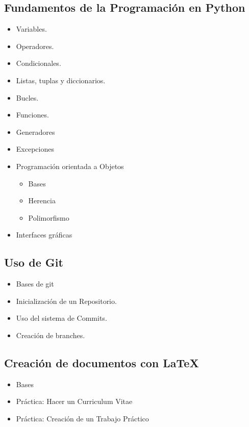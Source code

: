 \documentclass{article}
\begin{document}
\subsection{Fundamentos de la Programación en Python}
\begin{itemize}
	\item Variables.
	\item Operadores.
	\item Condicionales.
	\item Listas, tuplas y diccionarios.
	\item Bucles.
	\item Funciones.
	\item Generadores
	\item Excepciones
	\item Programación orientada a Objetos
	      \begin{itemize}
		      \item Bases
		      \item Herencia
		      \item Polimorfismo
	      \end{itemize}
	\item Interfaces gráficas
\end{itemize}

\subsection{Uso de Git}
\begin{itemize}
	\item Bases de git
	\item Inicialización de un Repositorio.
	\item Uso del sistema de Commits.
	\item Creación de branches.
\end{itemize}

\subsection{Creación de documentos con \LaTeX}
\begin{itemize}
	\item Bases
	\item Práctica: Hacer un Curriculum Vitae
	\item Práctica: Creación de un Trabajo Práctico
\end{itemize}
\end{document}
